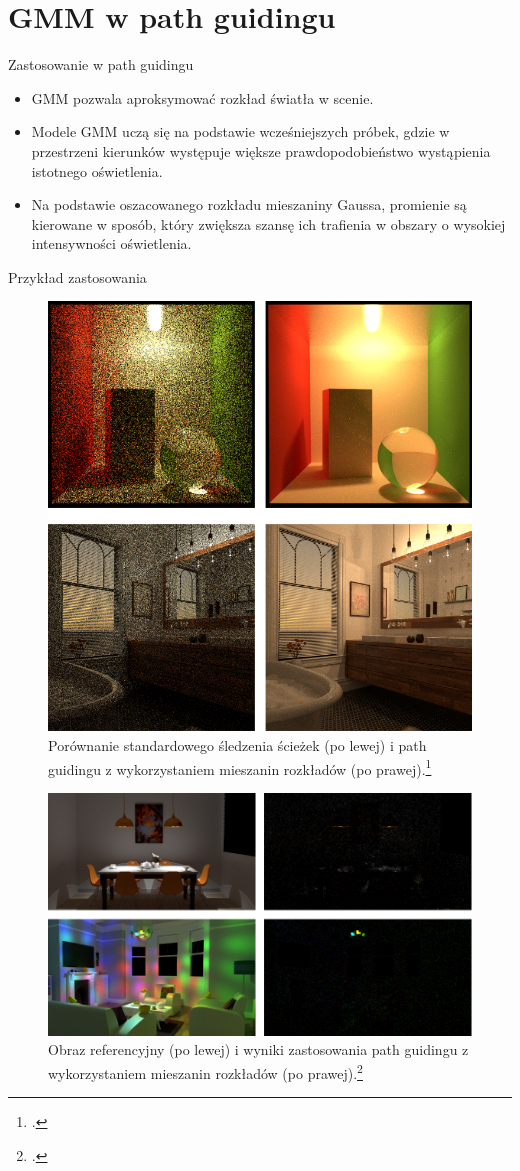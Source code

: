 \documentclass{beamer}
\begin{document}
\section{GMM w path guidingu}
\begin{frame}{Zastosowanie w path guidingu}
    \begin{itemize}
        \item GMM pozwala aproksymować rozkład światła w scenie.
        \item Modele GMM uczą się na podstawie wcześniejszych próbek, gdzie w przestrzeni kierunków występuje większe prawdopodobieństwo wystąpienia istotnego oświetlenia.
        \item Na podstawie oszacowanego rozkładu mieszaniny Gaussa, promienie są kierowane w sposób, który zwiększa szansę ich trafienia w obszary o wysokiej intensywności oświetlenia.
    \end{itemize}
\end{frame}

\begin{frame}{Przykład zastosowania}
\begin{figure}
    \centering
    \includegraphics[width=0.42\linewidth]{img/ruppert_comparison.png}
    \caption{Porównanie standardowego śledzenia ścieżek (po lewej) i path guidingu z wykorzystaniem mieszanin rozkładów (po prawej).\footcite{PMM}}
    \label{fig:enter-label}
\end{figure}

\end{frame}

\begin{frame}{}
    \begin{figure}
        \centering
        \includegraphics[width=0.8\linewidth]{img/ruppert_focal_bad.png}
        \caption{Obraz referencyjny (po lewej) i wyniki zastosowania path guidingu z wykorzystaniem mieszanin rozkładów (po prawej).\footcite{Focal_Guiding}}
        \label{fig:enter-label}
    \end{figure}
\end{frame}
\end{document}
